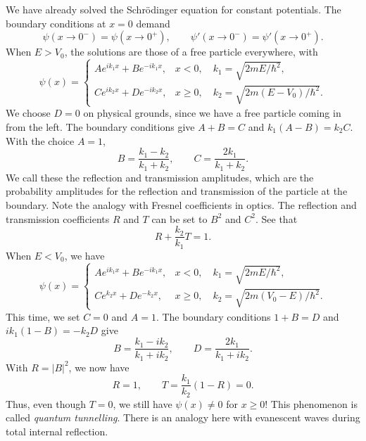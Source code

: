 \documentclass[11pt]{article}
\theoremstyle{definition}
\theoremstyle{remark}
\numberwithin{equation}{section}
\begin{document}
    We have already solved the Schr\"odinger equation for constant potentials. The
    boundary conditions at $x = 0$ demand \[
        \psi(x \to 0^-) = \psi(x \to 0^+), \qquad
        \psi'(x \to 0^-) = \psi'(x \to 0^+).
    \] When $E > V_0$, the solutions are those of a free particle everywhere, with
    \[
        \psi(x) = \begin{cases}
            Ae^{ik_1x} + Be^{-ik_1x}, & x < 0, \quad k_1 = \sqrt{2mE / \hbar^2}, \\
            Ce^{ik_2x} + De^{-ik_2x}, & x \geq 0, \quad k_2 = \sqrt{2m(E - V_0) /
            \hbar^2}.
        \end{cases}
    \] We choose $D = 0$ on physical grounds, since we have a free particle coming
    in from the left. The boundary conditions give $A + B = C$ and $k_1(A - B) =
    k_2C$. With the choice $A = 1$, \[
        B = \frac{k_1 - k_2}{k_1 + k_2}, \qquad C = \frac{2k_1}{k_1 + k_2}.
    \] We call these the reflection and transmission amplitudes, which are the
    probability amplitudes for the reflection and transmission of the particle at
    the boundary. Note the analogy with Fresnel coefficients in optics.
    The reflection and transmission coefficients $R$ and $T$ can be set to $B^2$ and
    $C^2$. See that \[
        R + \frac{k_2}{k_1}T = 1.
    \] When $E < V_0$, we have \[
        \psi(x) = \begin{cases}
            Ae^{ik_1x} + Be^{-ik_1x}, & x < 0, \quad k_1 = \sqrt{2mE / \hbar^2}, \\
            Ce^{k_2x} + De^{-k_2x}, & x \geq 0, \quad k_2 = \sqrt{2m(V_0 - E) /
            \hbar^2}.
        \end{cases}
    \] This time, we set $C = 0$ and $A = 1$. The boundary conditions $1 + B = D$
    and $ik_1(1 - B) = -k_2D$ give \[
        B = \frac{k_1 - ik_2}{k_1 + ik_2}, \qquad D = \frac{2k_1}{k_1 + ik_2}.
    \] With $R = |B|^2$, we now have \[
        R = 1, \qquad T = \frac{k_1}{k_2}(1 - R) = 0.
    \] Thus, even though $T = 0$, we still have $\psi(x) \neq 0$ for $x \geq 0$!
    This phenomenon is called \textit{quantum tunnelling}.
    There is an analogy here with evanescent waves during total internal reflection.
\end{document}
